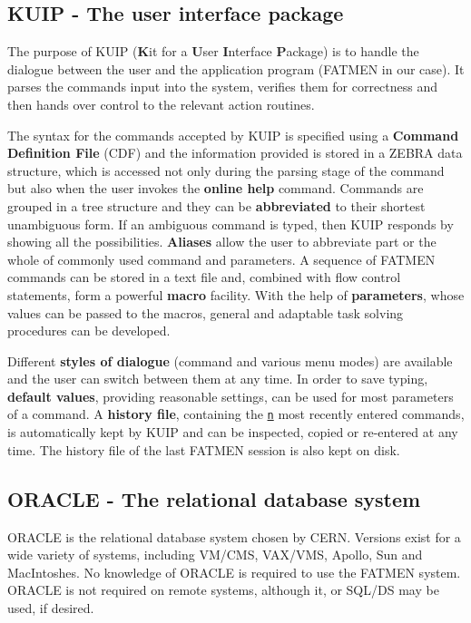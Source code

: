 \subsection{KUIP - The user interface package}
\par
The purpose of KUIP
({\bf K}it for a {\bf U}ser
{\bf I}nterface {\bf P}ackage) is to handle
the dialogue between the user and the application program (FATMEN
in our case). It
parses the commands input into the system, verifies them for
correctness and then hands over control to the relevant action
routines.
\par The syntax for the commands accepted by KUIP is specified using
a {\bf Command Definition File} (CDF)
and the information provided is stored in a
ZEBRA data structure, which is accessed not only during the
parsing stage of the command but also when the user invokes the
{\bf online help} command.
Commands are grouped in a tree structure and they can be
{\bf abbreviated} to their shortest unambiguous
form. If an ambiguous command is typed, then KUIP responds by showing
all the possibilities.
{\bf Aliases} allow the user to abbreviate part or the whole
of commonly used command and parameters.
A sequence of FATMEN commands can be stored in a text file and, combined
with flow control statements, form a powerful {\bf macro} facility.
With the help of {\bf parameters},
whose values can be passed to the macros, general and adaptable
task solving procedures can be developed.
\par Different {\bf styles of dialogue}
(command and various menu modes) are available
and the user can switch between them at any time.
In order to save typing, {\bf default values},
providing reasonable settings, can be used for most
parameters of a command. A {\bf history file},
containing the {\tt\underline{n}} most recently entered
commands, is automatically kept by KUIP
and can be inspected, copied or re-entered at any time.
The history file of the last FATMEN session is also kept on disk.
\subsection{ORACLE - The relational database system}
\par
ORACLE is the relational database system chosen by CERN. Versions
exist for a wide variety of systems, including VM/CMS, VAX/VMS, Apollo,
Sun and MacIntoshes. No knowledge of ORACLE is required to use the FATMEN
system. ORACLE is not required on remote systems, although it, or SQL/DS
may be used, if desired.
